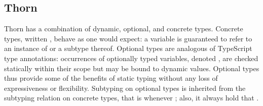 \documentclass[acmsmall, anonymous, authordraft, review]{acmart} %
\begin{document}
% 
% 

\subsection{Thorn}

Thorn has a combination of dynamic, optional, and concrete types.  Concrete
types, written \C, behave as one would expect: a variable \HT\x\C is
guaranteed to refer to an instance of \C or a subtype thereof.  Optional
types are analogous of TypeScript type annotations: occurrences of
optionally typed variables, denoted \HT\x{\dt\C}, are checked statically
within their scope but may be bound to dynamic values.  Optional types thus
provide some of the benefits of static typing without any loss of
expressiveness or flexibility.  Subtyping on optional types is inherited
from the subtyping relation on concrete types, that is {\dt\C} \Sub {\dt\D}
whenever \C \Sub \D; also, it always hold that \C \Sub \dt\C.
\end{document}
